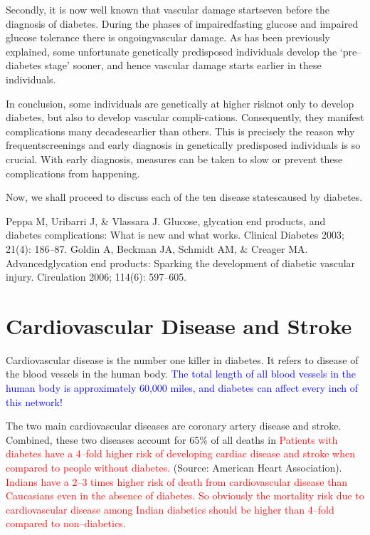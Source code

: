 Secondly, it is now well known that vascular damage starts\break even before the diagnosis of diabetes. During the phases of impaired\break fasting glucose and impaired glucose tolerance there is ongoing\break vascular damage. As has been previously explained, some unfortunate genetically predisposed individuals develop the ‘pre–diabetes stage’ sooner, and hence vascular damage starts earlier in these individuals.

In conclusion, some individuals are genetically at higher risk\break not only to develop diabetes, but also to develop vascular compli-\break cations. Consequently, they manifest complications many decades\break earlier than others. This is precisely the reason why frequent\break screenings and early diagnosis in genetically predisposed individuals is so crucial. With early diagnosis, measures can be taken to slow or prevent these complications from happening.

Now, we shall proceed to discuss each of the ten disease states\break caused by diabetes.

\begin{thebibliography}{99}
 Peppa M, Uribarri J, \& Vlassara J. Glucose, glycation end products, and diabetes complications: What is new and what works. Clinical Diabetes 2003; 21(4): 186–87.
 Goldin A, Beckman JA, Schmidt AM, \& Creager MA. Advanced\break glycation end products: Sparking the development of diabetic vascular injury. Circulation 2006; 114(6): 597–605.
\end{thebibliography}


\chapter{Cardiovascular Disease and Stroke}\label{chap12}

Cardiovascular disease is the number one killer in diabetes. It refers to disease of the blood vessels in the human body. \textcolor{blue}{The total length of all blood vessels in the human body is approximately 60,000 miles, and diabetes can affect every inch of this network!}

The two main cardiovascular diseases are coronary artery disease and stroke. Combined, these two diseases account for 65\% of all deaths in \textcolor{red}{Patients with diabetes have a 4–fold higher risk of developing cardiac disease and stroke when compared to people without diabetes.} (Source: American Heart Association). \textcolor{red}{Indians have a 2–3 times higher risk of death from cardiovascular disease than Caucasians even in the absence of diabetes. So obviously the mortality risk due to cardiovascular disease among Indian diabetics should be higher than 4–fold compared to non–diabetics.}

